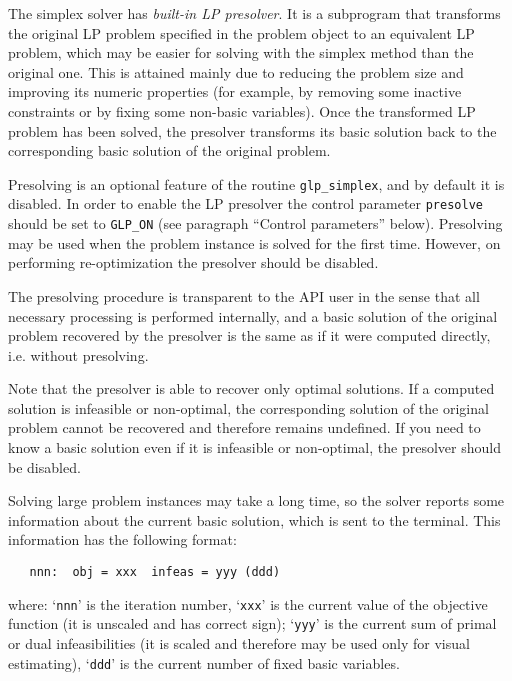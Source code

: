 
The simplex solver has {\it built-in LP presolver}. It is a subprogram
that transforms the original LP problem specified in the problem object
to an equivalent LP problem, which may be easier for solving with the
simplex method than the original one. This is attained mainly due to
reducing the problem size and improving its numeric properties (for
example, by removing some inactive constraints or by fixing some
non-basic variables). Once the transformed LP problem has been solved,
the presolver transforms its basic solution back to the corresponding
basic solution of the original problem.

Presolving is an optional feature of the routine \verb|glp_simplex|,
and by default it is disabled. In order to enable the LP presolver the
control parameter \verb|presolve| should be set to \verb|GLP_ON| (see
paragraph ``Control parameters'' below). Presolving may be used when
the problem instance is solved for the first time. However, on
performing re-optimization the presolver should be disabled.

The presolving procedure is transparent to the API user in the sense
that all necessary processing is performed internally, and a basic
solution of the original problem recovered by the presolver is the same
as if it were computed directly, i.e. without presolving.

Note that the presolver is able to recover only optimal solutions. If
a computed solution is infeasible or non-optimal, the corresponding
solution of the original problem cannot be recovered and therefore
remains undefined. If you need to know a basic solution even if it is
infeasible or non-optimal, the presolver should be disabled.


Solving large problem instances may take a long time, so the solver
reports some information about the current basic solution, which is
sent to the terminal. This information has the following format:

\begin{verbatim}
   nnn:  obj = xxx  infeas = yyy (ddd)
\end{verbatim}

\noindent
where: `\verb|nnn|' is the iteration number, `\verb|xxx|' is the
current value of the objective function (it is unscaled and has correct
sign); `\verb|yyy|' is the current sum of primal or dual
infeasibilities (it is scaled and therefore may be used only for visual
estimating), `\verb|ddd|' is the current number of fixed basic
variables.


